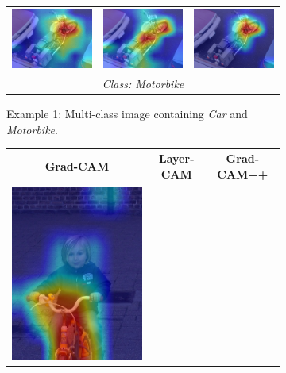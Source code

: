 \begin{figure}[!t]
{\begin{minipage}{0.9\textwidth}
\begin{subfigure}[t]{0.48\textwidth}
\begin{tabular}{c c c}
          \includegraphics[width=0.32\linewidth, height=0.32\linewidth]{figures/cams/gradcam/2008_007558_13} &
          \includegraphics[width=0.32\linewidth, height=0.32\linewidth]{figures/cams/layercam/2008_007558_13} &
          \includegraphics[width=0.32\linewidth, height=0.32\linewidth]{figures/cams/gradcampp/2008_007558_13} \\
          \multicolumn{3}{c}{{\scriptsize \textit{Class: Motorbike}}} \\
        \end{tabular}
        \caption{Example 1: Multi-class image containing \textit{Car} and \textit{Motorbike}.}
        \label{fig:cam_multiclass_a}
      \end{subfigure}
      \hfill
      \begin{subfigure}[t]{0.48\textwidth}
        \centering
        \begin{tabular}{c c c}
          {\scriptsize \textbf{Grad-CAM}} & {\scriptsize \textbf{Layer-CAM}} & {\scriptsize \textbf{Grad-CAM++}} \\[2pt]
          \includegraphics[width=0.32\linewidth, height=0.32\linewidth]{figures/cams/gradcam/2009_001718_1} &

\end{tabular}
\end{subfigure}
\end{minipage}}
\end{figure}
